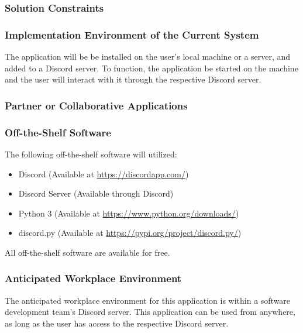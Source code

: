 \documentclass[12pt, titlepage]{article}
\begin{document}
\subsubsection{Solution Constraints}

\subsubsection{Implementation Environment of the Current System}
The application will be be installed on the user's local machine or a server, and added to a Discord server. To function, the application be started on the machine and the user will interact with it through the respective Discord server.

\subsubsection{Partner or Collaborative Applications}

\subsubsection{Off-the-Shelf Software}
The following off-the-shelf software will utilized:
\begin{itemize}
    \item Discord (Available at \url{https://discordapp.com/})
    \item Discord Server (Available through Discord)
    \item Python 3 (Available at \url{https://www.python.org/downloads/})
    \item discord.py (Available at \url{https://pypi.org/project/discord.py/})
\end{itemize}
All off-the-shelf software are available for free.

\subsubsection{Anticipated Workplace Environment}
The anticipated workplace environment for this application is within a software development team's Discord server. This application can be used from anywhere, as long as the user has access to the respective Discord server.
\end{document}
